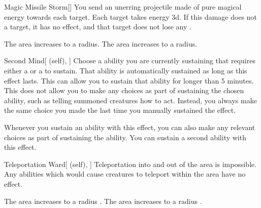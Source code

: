 \lowercase{\hypertarget{spell:Magic Missile Storm}{}}\label{spell:Magic Missile Storm}
\begin{freeability}[Rank 4]{\hypertarget{spell:Magic Missile Storm}{Magic Missile Storm}}[]
You send an unerring projectile made of pure magical energy towards each target.
Each target takes energy  \minus3d.
If this damage does not  a target, it has no effect, and that target does not lose any .

\rankline
{} The area increases to a \arealarge radius.
 The area increases to a \areahuge radius.
\end{freeability}
\vspace{0.25em}



\lowercase{\hypertarget{spell:Second Mind}{}}\label{spell:Second Mind}
\begin{attuneability}[Rank 4]{\hypertarget{spell:Second Mind}{Second Mind}}[ (self), ]
Choose a  ability you are currently sustaining that requires either a  or a  to sustain.
That ability is automatically sustained as long as this effect lasts.
This can allow you to sustain that ability for longer than 5 minutes.
This does not allow you to make any choices as part of sustaining the chosen ability, such as telling summoned creatures how to act.
Instead, you always make the same choice you made the last time you manually sustained the effect.

\rankline
{} Whenever you sustain an ability with this effect, you can also make any relevant choices as part of sustaining the ability.
 You can sustain a second ability with this effect.
\end{attuneability}
\vspace{0.25em}



\lowercase{\hypertarget{spell:Teleportation Ward}{}}\label{spell:Teleportation Ward}
\begin{attuneability}[Rank 4]{\hypertarget{spell:Teleportation Ward}{Teleportation Ward}}[ (self), ]
Teleportation into and out of the area is impossible.
Any abilities which would cause creatures to teleport within the area have no effect.

\rankline
{} The area increases to a \areahuge radius .
 The area increases to a \areaext radius .
\end{attuneability}
\vspace{0.25em}



